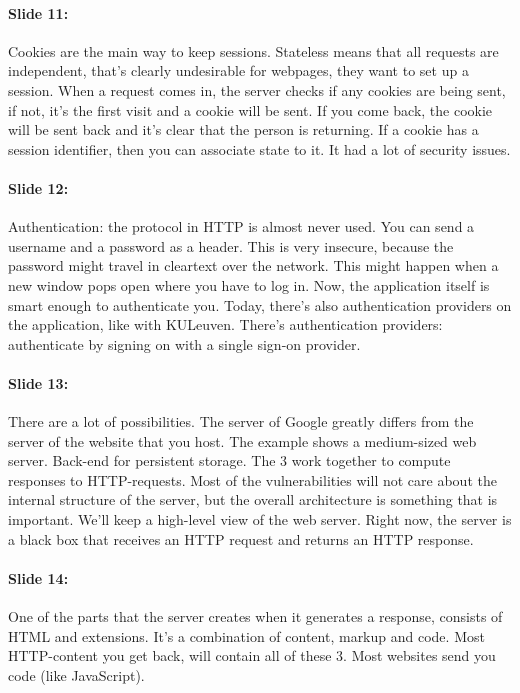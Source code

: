 \documentclass[10pt,a4paper]{report}
\begin{document}
\paragraph{Slide 11:} Cookies are the main way to keep sessions. Stateless means that all requests are independent, that's clearly undesirable for webpages, they want to set up a session. When a request comes in, the server checks if any cookies are being sent, if not, it's the first visit and a cookie will be sent. If you come back, the cookie will be sent back and it's clear that the person is returning. If a cookie has a session identifier, then you can associate state to it. 
It had a lot of security issues. 

\paragraph{Slide 12:} Authentication: the protocol in HTTP is almost never used. You can send a username and a password as a header. This is very insecure, because the password might travel in cleartext over the network. This might happen when a new window pops open where you have to log in. Now, the application itself is smart enough to authenticate you. 
Today, there's also authentication providers on the application, like with KULeuven. There's authentication providers: authenticate by signing on with a single sign-on provider. 

\paragraph{Slide 13:} There are a lot of possibilities. The server of Google greatly differs from the server of the website that you host. The example shows a medium-sized web server. Back-end for persistent storage.
The 3 work together to compute responses to HTTP-requests.
Most of the vulnerabilities will not care about the internal structure of the server, but the overall architecture is something that is important. We'll keep a high-level view of the web server. Right now, the server is a black box that receives an HTTP request and returns an HTTP response.

\paragraph{Slide 14:} One of the parts that the server creates when it generates a response, consists of HTML and extensions. It's a combination of content, markup and code. Most HTTP-content you get back, will contain all of these 3. Most websites send you code (like JavaScript).
\end{document}
